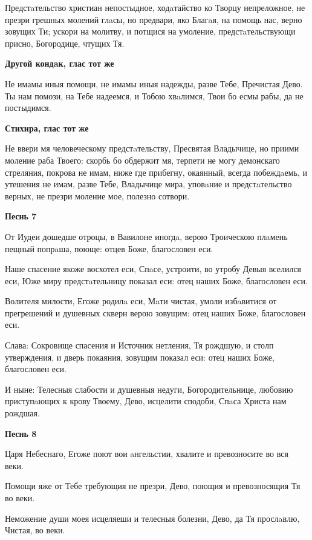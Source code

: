 Предстaтельство христиан непостыдное, ходaтайство ко Творцу непреложное, не презри грешных молений глaсы, но предвари, яко Благaя, на помощь нас, верно зовущих Ти; ускори на молитву, и потщися на умоление, предстaтельствующи присно, Богородице, чтущих Тя.


\medskip
\bfseries Другой кондaк, глас тот же\normalfont{}





 Не имамы иныя помощи, не имамы иныя надежды, разве Тебе, Пречистая Дево. Ты нам помози, на Тебе надеемся, и Тобою хвaлимся, Твои бо есмы рабы, да не постыдимся.


\medskip
\bfseries Стихира, глас тот же\normalfont{}

Не ввери мя человеческому предстaтельству, Пресвятая Владычице, но приими моление раба Твоего: скорбь бо обдержит мя, терпети не могу демонскаго стреляния, покрова не имам, ниже где прибегну, окаянный, всегда побеждaемь, и утешения не имам, разве Тебе, Владычице мира, уповaние и предстaтельство верных, не презри моление мое, полезно сотвори.


\medskip
\bfseries Песнь 7\normalfont{}


От Иудеи дошедше отроцы, в Вавилоне иногдa, верою Троическою плaмень пещный попрaша, поюще: отцев Боже, благословен еси.


Наше спасение якоже восхотел еси, Спaсе, устроити, во утробу Девыя вселился еси, Юже миру предстaтельницу показал еси: отец наших Боже, благословен еси.


Волителя милости, Егоже родилa еси, Мaти чистая, умоли избaвитися от прегрешений и душевных скверн верою зовущим: отец наших Боже, благословен еси.


Слава: Сокровище спасения и Источник нетления, Тя рождшую, и столп утверждения, и дверь покаяния, зовущим показал еси: отец наших Боже, благословен еси.


И ныне: Телесныя слабости и душевныя недуги, Богородительнице, любовию приступaющих к крову Твоему, Дево, исцелити сподоби, Спaса Христа нам рождшая.


\medskip
\bfseries Песнь 8\normalfont{}

Царя Небеснаго, Егоже поют вои aнгельстии, хвалите и превозносите во вся веки.

Помощи яже от Тебе требующия не презри, Дево, поющия и превозносящия Тя во веки.

Неможение души моея исцеляеши и телесныя болезни, Дево, да Тя прослaвлю, Чистая, во веки.

